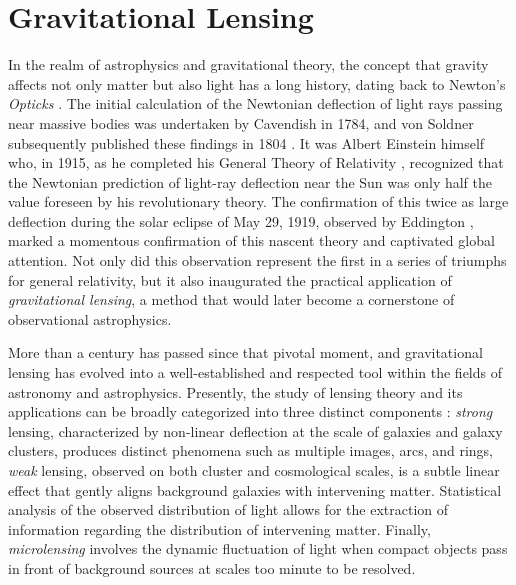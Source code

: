 \chapter[Gravitational lensing]{Gravitational Lensing}
\label{chap:gravitational_lensing}

In the realm of astrophysics and gravitational theory, the concept that gravity affects not only matter but also light has a long history, dating back to Newton's \emph{Opticks} \citep{newton_opticks_1704}.
The initial calculation of the Newtonian deflection of light rays passing near massive bodies was undertaken by Cavendish in 1784, and von Soldner subsequently published these findings in 1804 \citep{will_henry_1988,will_confrontation_2014}. It was Albert Einstein himself who, in 1915, as he completed his General Theory of Relativity \citep{einstein_feldgleichungen_1915}, recognized that the Newtonian prediction of light-ray deflection near the Sun was only half the value foreseen by his revolutionary theory. The confirmation of this twice as large deflection during the solar eclipse of May 29, 1919, observed by Eddington \citep{dyson_ix_1920,will_1919_2015}, marked a momentous confirmation of this nascent theory and captivated global attention. Not only did this observation represent the first in a series of triumphs for general relativity, but it also inaugurated the practical application of \emph{gravitational lensing}, a method that would later become a cornerstone of observational astrophysics.

More than a century has passed since that pivotal moment, and gravitational lensing has evolved into a well-established and respected tool within the fields of astronomy and astrophysics. Presently, the study of lensing theory and its applications can be broadly categorized into three distinct components \citep{kochanek_saas_2004}: \emph{strong} lensing, characterized by non-linear deflection at the scale of galaxies and galaxy clusters, produces distinct phenomena such as multiple images, arcs, and rings, \emph{weak} lensing, observed on both cluster and cosmological scales, is a subtle linear effect that gently aligns background galaxies with intervening matter. Statistical analysis of the observed distribution of light allows for the extraction of information regarding the distribution of intervening matter. Finally, \emph{microlensing} involves the dynamic fluctuation of light when compact objects pass in front of background sources at scales too minute to be resolved.




